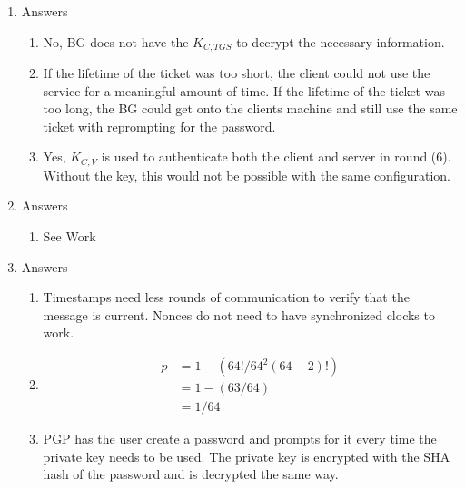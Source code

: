 \documentclass{article}
\begin{document}
\begin{enumerate}
    \item Answers
    \begin{enumerate}
        \item No, BG does not have the $K_{C, TGS}$ to decrypt the necessary information.
        
        \item If the lifetime of the ticket was too short, the client could not use the service for a meaningful amount of time. If the lifetime of the ticket was too long, the BG could get onto the clients machine and still use the same ticket with reprompting for the password.

        \item Yes, $K_{C, V}$ is used to authenticate both the client and server in round (6). Without the key, this would not be possible with the same configuration.
    \end{enumerate}

    \item Answers
    \begin{enumerate}
        \item See Work
    \end{enumerate}

    \item Answers
    \begin{enumerate}
        \item Timestamps need less rounds of communication to verify that the message is current. Nonces do not need to have synchronized clocks to work.

        \item \begin{align*}
           p &= 1 - ({64!}/{64^2 (64-2)!}) \\
           &= 1 - (63/64) \\
           &= 1/64
        \end{align*}
        

        \item PGP has the user create a password and prompts for it every time the private key needs to be used. The private key is encrypted with the SHA hash of the password and is decrypted the same way.


\end{enumerate}
\end{enumerate}
\end{document}
